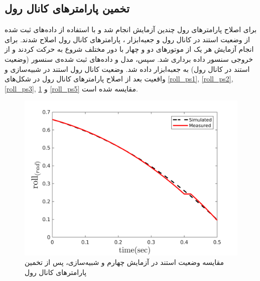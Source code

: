 \subsection{تخمین پارامترهای کانال رول}
برای اصلاح پارامترهای رول چندین آزمایش انجام شد و با استفاده از داده‌های ثبت شده از وضعیت استند در کانال رول و جعبه‌ابزار
،
پارامترهای کانال رول اصلاح شدند.
برای انجام آزمایش هر یک از موتورهای دو و چهار  با دور مختلف شروع به حرکت کردند و از خروجی سنسور داده برداری شد. سپس، مدل و داده‌های ثبت شده‌ی سنسور (وضعیت استند در کانال رول) به جعبه‌ابزار
داده شد. وضعیت کانال رول استند در شبیه‌سازی و واقعیت بعد از اصلاح پارامترهای کانال رول در شکل‌های
\ref{roll_ps1}, \ref{roll_ps2}, \ref{roll_ps3}, \ref{roll_ps4} و \ref{roll_ps5}
مقایسه شده است.
%
\begin{figure}[H]
	\includegraphics[width=.55\linewidth]{../Figures/RCP/roll_parameter_estimation/RCP_roll_S4.png}
	\centering
	\caption{مقايسه وضعیت استند در  آزمايش چهارم و شبیه‌سازی، پس از تخمین پارامترهای کانال رول}
	\label{roll_ps4}
\end{figure}
